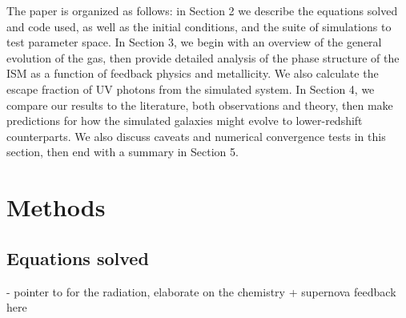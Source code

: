 \documentclass[twocolumn,linenumbers]{aastex631}
\begin{document}
The paper is organized as follows: in Section 2 we describe the equations solved and code used, as well as the initial conditions, and the suite of simulations to test parameter space. In Section 3, we begin with an overview of the general evolution of the gas, then provide detailed analysis of the phase structure of the ISM as a function of feedback physics and metallicity. We also calculate the escape fraction of UV photons from the simulated system. In Section 4, we compare our results to the literature, both observations and theory, then make predictions for how the simulated galaxies might evolve to lower-redshift counterparts. We also discuss caveats and numerical convergence tests in this section, then end with a summary in Section 5.


\section{Methods}
\subsection{Equations solved}
- pointer to \citep{2023MNRAS.521.5160M} for the radiation, elaborate on the chemistry + supernova feedback here
\end{document}
